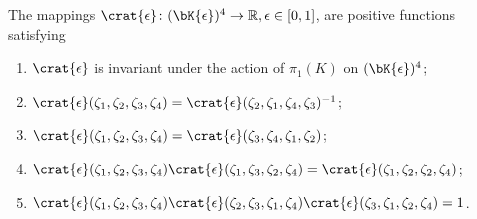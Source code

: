 \documentclass[reqno,11pt]{amsart}
\begin{document}
    \begin{prop}\label{pps:crat_properties}
        The mappings \(\crat{\epsilon}\colon (\bK{\epsilon})^4 \to \mathbb{R}, \epsilon \in [0,1]\), are positive functions satisfying
        \begin{enumerate}
            \item \( \crat{\epsilon} \) is invariant under the action of \( \pi_1(K) \) on \( (\bK{\epsilon})^4 \);
            \item \( \crat{\epsilon}(\zeta_1, \zeta_2, \zeta_3, \zeta_4) = \crat{\epsilon}(\zeta_2, \zeta_1, \zeta_4, \zeta_3)^{-1} \);
            \item \( \crat{\epsilon}(\zeta_1, \zeta_2, \zeta_3, \zeta_4) = \crat{\epsilon}(\zeta_3, \zeta_4, \zeta_1, \zeta_2) \);
            \item \( \crat{\epsilon}(\zeta_1, \zeta_2, \zeta_3, \zeta_4)\crat{\epsilon}(\zeta_1, \zeta_3, \zeta_2, \zeta_4) = \crat{\epsilon}(\zeta_1, \zeta_2, \zeta_2, \zeta_4) \);
            \item \( \crat{\epsilon}(\zeta_1, \zeta_2, \zeta_3, \zeta_4)\crat{\epsilon}(\zeta_2, \zeta_3, \zeta_1, \zeta_4)\crat{\epsilon}(\zeta_3, \zeta_1, \zeta_2, \zeta_4) = 1 \).
        \end{enumerate}
    \end{prop}
\end{document}
